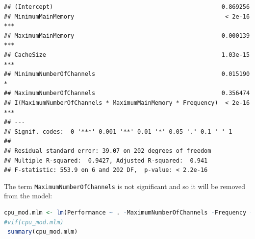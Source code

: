 \documentclass[
]{article}
\newcommand{\passthrough}[1]{#1}
\begin{document}
\begin{lstlisting}
## (Intercept)                                                0.869256    
## MinimumMainMemory                                           < 2e-16 ***
## MaximumMainMemory                                          0.000139 ***
## CacheSize                                                  1.03e-15 ***
## MinimumNumberOfChannels                                    0.015190 *  
## MaximumNumberOfChannels                                    0.356474    
## I(MaximumNumberOfChannels * MaximumMainMemory * Frequency)  < 2e-16 ***
## ---
## Signif. codes:  0 '***' 0.001 '**' 0.01 '*' 0.05 '.' 0.1 ' ' 1
## 
## Residual standard error: 39.07 on 202 degrees of freedom
## Multiple R-squared:  0.9427, Adjusted R-squared:  0.941 
## F-statistic: 553.9 on 6 and 202 DF,  p-value: < 2.2e-16
\end{lstlisting}

The term \passthrough{\lstinline!MaximumNumberOfChannels!} is not
significant and so it will be removed from the model:

\begin{lstlisting}[language=R]
cpu_mod.mlm <- lm(Performance ~ . -MaximumNumberOfChannels -Frequency -CycleTime + I(MaximumNumberOfChannels * MaximumMainMemory * Frequency)  , data = cpu) 
#vif(cpu_mod.mlm)
 summary(cpu_mod.mlm)
\end{lstlisting}
\end{document}
